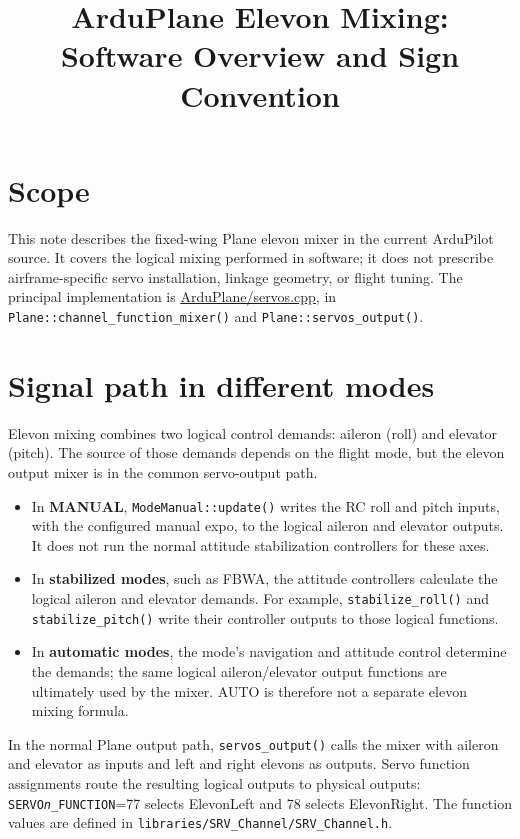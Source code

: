 \documentclass[11pt]{article}
\title{ArduPlane Elevon Mixing: Software Overview and Sign Convention}
\author{}
\date{}
\begin{document}
\maketitle

\section{Scope}

This note describes the fixed-wing Plane elevon mixer in the current ArduPilot
source. It covers the logical mixing performed in software; it does not prescribe
airframe-specific servo installation, linkage geometry, or flight tuning.
The principal implementation is
\url{ArduPlane/servos.cpp}, in \texttt{Plane::channel\_function\_mixer()} and
\texttt{Plane::servos\_output()}.

\section{Signal path in different modes}

Elevon mixing combines two logical control demands: aileron (roll) and elevator
(pitch). The source of those demands depends on the flight mode, but the
elevon output mixer is in the common servo-output path.

\begin{itemize}
  \item In \textbf{MANUAL}, \texttt{ModeManual::update()} writes the RC roll and
  pitch inputs, with the configured manual expo, to the logical aileron and
  elevator outputs. It does not run the normal attitude stabilization
  controllers for these axes.
  \item In \textbf{stabilized modes}, such as FBWA, the attitude controllers
  calculate the logical aileron and elevator demands. For example,
  \texttt{stabilize\_roll()} and \texttt{stabilize\_pitch()} write their
  controller outputs to those logical functions.
  \item In \textbf{automatic modes}, the mode's navigation and attitude control
  determine the demands; the same logical aileron/elevator output functions are
  ultimately used by the mixer. AUTO is therefore not a separate elevon mixing
  formula.
\end{itemize}

In the normal Plane output path, \texttt{servos\_output()} calls the mixer with
aileron and elevator as inputs and left and right elevons as outputs. Servo
function assignments route the resulting logical outputs to physical outputs:
\texttt{SERVO\textit{n}\_FUNCTION}=77 selects ElevonLeft and 78 selects
ElevonRight. The function values are defined in
\texttt{libraries/SRV\_Channel/SRV\_Channel.h}.
\end{document}
